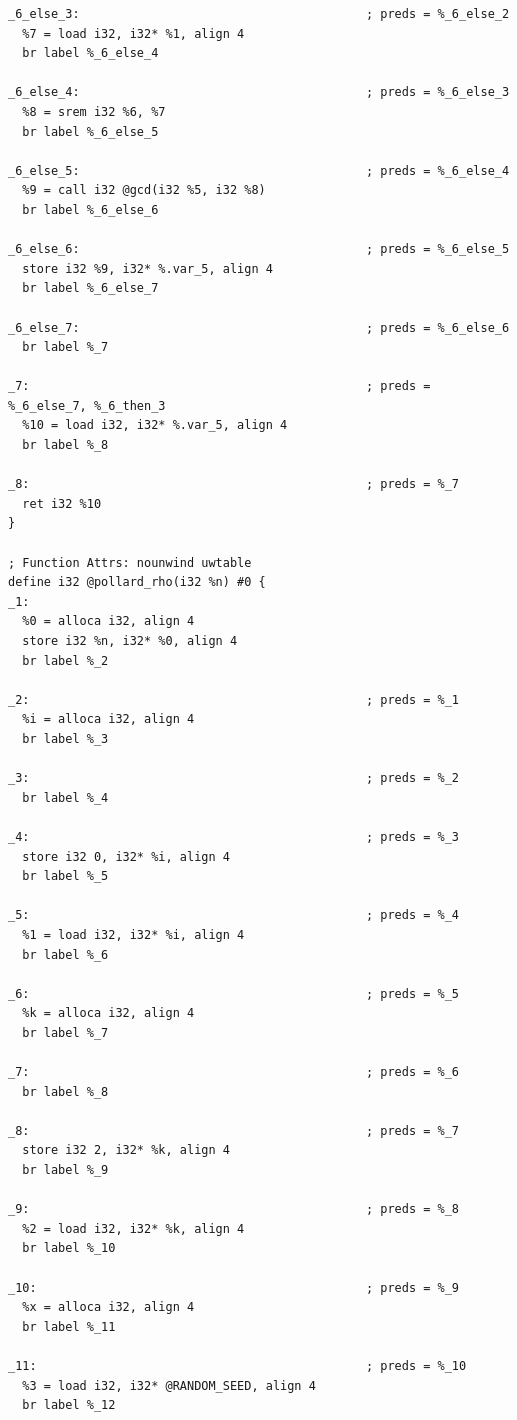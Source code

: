 \documentclass[12pt,a4paper]{article}
\begin{document}
\begin{verbatim}
_6_else_3:                                        ; preds = %_6_else_2
  %7 = load i32, i32* %1, align 4
  br label %_6_else_4

_6_else_4:                                        ; preds = %_6_else_3
  %8 = srem i32 %6, %7
  br label %_6_else_5

_6_else_5:                                        ; preds = %_6_else_4
  %9 = call i32 @gcd(i32 %5, i32 %8)
  br label %_6_else_6

_6_else_6:                                        ; preds = %_6_else_5
  store i32 %9, i32* %.var_5, align 4
  br label %_6_else_7

_6_else_7:                                        ; preds = %_6_else_6
  br label %_7

_7:                                               ; preds = %_6_else_7, %_6_then_3
  %10 = load i32, i32* %.var_5, align 4
  br label %_8

_8:                                               ; preds = %_7
  ret i32 %10
}

; Function Attrs: nounwind uwtable
define i32 @pollard_rho(i32 %n) #0 {
_1:
  %0 = alloca i32, align 4
  store i32 %n, i32* %0, align 4
  br label %_2

_2:                                               ; preds = %_1
  %i = alloca i32, align 4
  br label %_3

_3:                                               ; preds = %_2
  br label %_4

_4:                                               ; preds = %_3
  store i32 0, i32* %i, align 4
  br label %_5

_5:                                               ; preds = %_4
  %1 = load i32, i32* %i, align 4
  br label %_6

_6:                                               ; preds = %_5
  %k = alloca i32, align 4
  br label %_7

_7:                                               ; preds = %_6
  br label %_8

_8:                                               ; preds = %_7
  store i32 2, i32* %k, align 4
  br label %_9

_9:                                               ; preds = %_8
  %2 = load i32, i32* %k, align 4
  br label %_10

_10:                                              ; preds = %_9
  %x = alloca i32, align 4
  br label %_11

_11:                                              ; preds = %_10
  %3 = load i32, i32* @RANDOM_SEED, align 4
  br label %_12


\end{verbatim}
\end{document}
